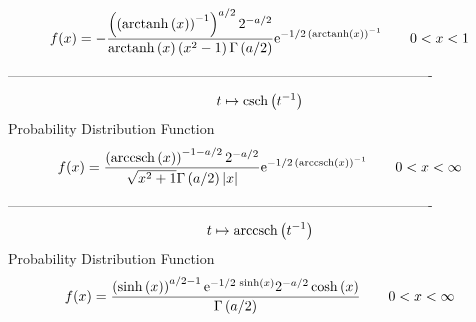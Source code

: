 \documentclass[12pt]{article}
\begin{document}
$$  f(x)=-{\frac { \left(  \left( {\rm arctanh} \left(x\right) \right) ^{-1}
 \right) ^{a/2}{2}^{-a/2}}{{\rm arctanh} \left(x\right) \left( {x}^{2}
-1 \right) \Gamma \left( a/2 \right) }{{\rm e}^{-1/2\, \left( 
{\rm arctanh} \left(x\right) \right) ^{-1}}}}
 \qquad0
 < x < 1
$$-------------------------------------------------------------------------------------------  \\$$t\mapsto {\rm csch} \left({t}^{-1}\right)
$$Probability Distribution Function 
$$  f(x)={\frac { \left( {\rm arccsch} \left(x\right) \right) ^{-1-a/2}{2}^{-a/
2}}{\sqrt {{x}^{2}+1}\Gamma \left( a/2 \right)  \left| x \right| }{
{\rm e}^{-1/2\, \left( {\rm arccsch} \left(x\right) \right) ^{-1}}}}
 \qquad0
 < x < \infty 
$$-------------------------------------------------------------------------------------------  \\$$t\mapsto {\rm arccsch} \left({t}^{-1}\right)
$$Probability Distribution Function 
$$  f(x)={\frac { \left( \sinh \left( x \right)  \right) ^{a/2-1}{{\rm e}^{-1/2
\,\sinh \left( x \right) }}{2}^{-a/2}\cosh \left( x \right) }{\Gamma
 \left( a/2 \right) }}
 \qquad0
 < x < \infty 
$$
\end{document}
